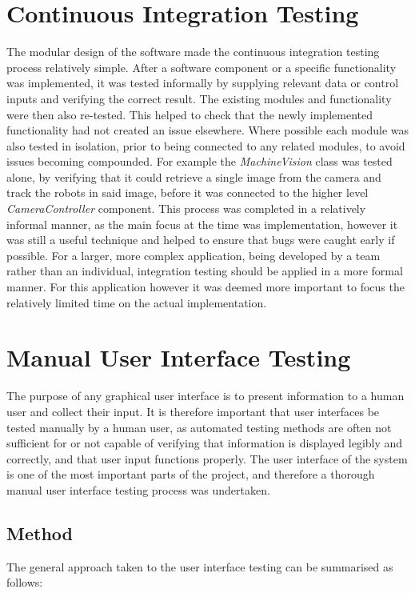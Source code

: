 \section{Continuous Integration Testing} \label{ContinuousIntegrationTesting}
The modular design of the software made the continuous integration testing process relatively simple. After a software component or a specific functionality was implemented, it was tested informally by supplying relevant data or control inputs and verifying the correct result. The existing modules and functionality were then also re-tested. This helped to check that the newly implemented functionality had not created an issue elsewhere. Where possible each module was also tested in isolation, prior to being connected to any related modules, to avoid issues becoming compounded. For example the \textit{MachineVision} class was tested alone, by verifying that it could retrieve a single image from the camera and track the robots in said image, before it was connected to the higher level \textit{CameraController} component. This process was completed in a relatively informal manner, as the main focus at the time was implementation, however it was still a useful technique and helped to ensure that bugs were caught early if possible. For a larger, more complex application, being developed by a team rather than an individual, integration testing should be applied in a more formal manner. For this application however it was deemed more important to focus the relatively limited time on the actual implementation.


\section{Manual User Interface Testing} \label{ManualUserInterfaceTesting}
The purpose of any graphical user interface is to present information to a human user and collect their input. It is therefore important that user interfaces be tested manually by a human user, as automated testing methods are often not sufficient for or not capable of verifying that information is displayed legibly and correctly, and that user input functions properly. The user interface of the system is one of the most important parts of the project, and therefore a thorough manual user interface testing process was undertaken.

\subsection{Method}
The general approach taken to the user interface testing can be summarised as follows:

